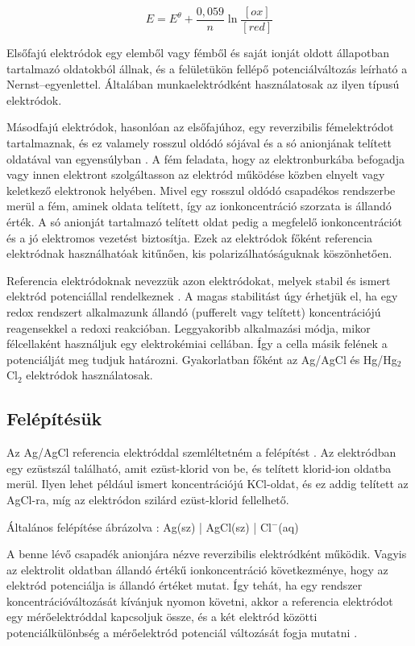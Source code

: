 \begin{equation}
E = E^\theta + \frac{0,059}{n}\ln \frac{[ox]}{[red]}
\label{eq:nernst}
\end{equation}

Elsőfajú elektródok egy elemből vagy fémből és saját ionját oldott állapotban tartalmazó oldatokból állnak, és a felületükön fellépő potenciálváltozás leírható a Nernst--egyenlettel. Általában munkaelektródként használatosak az ilyen típusú elektródok.

Másodfajú elektródok, hasonlóan az elsőfajúhoz, egy reverzibilis fémelektródot tartalmaznak, és ez valamely rosszul oldódó sójával és a só anionjának telített oldatával van egyensúlyban \cite{preisich1960}. A fém feladata, hogy az elektronburkába befogadja vagy innen elektront szolgáltasson az elektród működése közben elnyelt vagy keletkező elektronok helyében. Mivel egy rosszul oldódó csapadékos rendszerbe merül a fém, aminek oldata telített, így az ionkoncentráció szorzata is állandó érték. A só anionját tartalmazó telített oldat pedig a megfelelő ionkoncentrációt és a jó elektromos vezetést biztosítja. Ezek az elektródok főként referencia elektródnak használhatóak kitűnően, kis polarizálhatóságuknak köszönhetően.

Referencia elektródoknak nevezzük azon elektródokat, melyek stabil és ismert elektród potenciállal rendelkeznek \cite{allen2001electrochemical}. A magas stabilitást úgy érhetjük el, ha egy redox rendszert alkalmazunk állandó (pufferelt vagy telített) koncentrációjú reagensekkel a redoxi reakcióban. Leggyakoribb alkalmazási módja, mikor félcellaként használjuk egy elektrokémiai cellában. Így a cella másik felének a potenciálját meg tudjuk határozni. Gyakorlatban főként az Ag/AgCl és Hg/Hg$_2$Cl$_2$ elektródok használatosak. 

\subsection{Felépítésük}

Az Ag/AgCl referencia elektróddal szemléltetném a felépítést \cite{janz1968silver}. Az elektródban egy ezüstszál található, amit ezüst-klorid von be, és telített klorid-ion oldatba merül. Ilyen lehet például ismert koncentrációjú KCl-oldat, és ez addig telített az AgCl-ra, míg az elektródon szilárd ezüst-klorid fellelhető.


Általános felépítése ábrázolva : Ag(sz) | AgCl(sz) | Cl$^-$(aq)


A benne lévő csapadék anionjára nézve reverzibilis elektródként működik. Vagyis az elektrolit oldatban állandó értékű ionkoncentráció következménye, hogy az elektród potenciálja is állandó értéket mutat. Így tehát, ha egy rendszer koncentrációváltozását kívánjuk nyomon követni, akkor a referencia elektródot egy mérőelektróddal kapcsoljuk össze, és a két elektród közötti potenciálkülönbség a mérőelektród potenciál változását fogja mutatni \cite{harris2010quantitative}.

